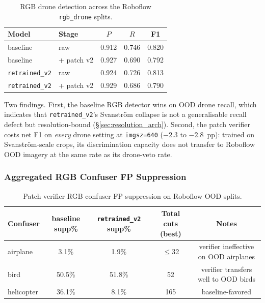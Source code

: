 \begin{table}[htbp]
    \centering
    \caption{RGB drone detection across the Roboflow \texttt{rgb\_drone} splits.}
    \label{tab:ood_rgb_drone}
    \begin{tabular}{llccc}
        \toprule
        Model & Stage & $P$ & $R$ & F1 \\
        \midrule
        baseline      & raw           & 0.912 & 0.746 & 0.820 \\
        baseline      & + patch v2    & 0.927 & 0.690 & 0.792 \\
        \texttt{retrained\_v2}  & raw           & 0.924 & 0.726 & 0.813 \\
        \texttt{retrained\_v2}  & + patch v2    & 0.929 & 0.686 & 0.790 \\
        \bottomrule
    \end{tabular}
\end{table}

Two findings. First, the baseline RGB detector wins on OOD drone recall, which indicates that \texttt{retrained\_v2}'s Svanstr\"om collapse is not a generalisable recall defect but resolution-bound (\S\ref{sec:resolution_arch}). Second, the patch verifier costs net F1 on \emph{every} drone setting at \texttt{imgsz=640} ($-2.3$ to $-2.8$~pp): trained on Svanstr\"om-scale crops, its discrimination capacity does not transfer to Roboflow OOD imagery at the same rate as its drone-veto rate.

\subsubsection{Aggregated RGB Confuser FP Suppression}

\begin{table}[htbp]
    \centering
    \caption{Patch verifier RGB confuser FP suppression on Roboflow OOD splits.}
    \label{tab:ood_rgb_confuser}
    \begin{tabular}{lcccc}
        \toprule
        Confuser & baseline supp\% & \texttt{retrained\_v2} supp\% & Total cuts (best) & Notes \\
        \midrule
        airplane   &  3.1\% &  1.9\% &  $\leq$32 & verifier ineffective on OOD airplanes \\
        bird       & 50.5\% & 51.8\% & 52 & verifier transfers well to OOD birds \\
        helicopter & 36.1\% &  8.1\% & 165 & baseline-favored \\
        \bottomrule
    \end{tabular}
\end{table}

